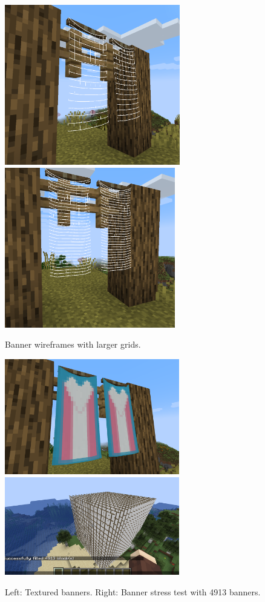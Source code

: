 \documentclass[12pt]{article}
\begin{document}
\begin{figure}[hp]
    \begin{center}
        \includegraphics[height=2.75in]{images/bannermidgridwf.png}
        \includegraphics[height=2.75in]{images/bannerlargegridwf.png}
    \end{center}
    \caption{Banner wireframes with larger grids.}
\end{figure}

\begin{figure}[hp]
    \begin{center}
        \includegraphics[width=3in]{images/transbanners.png}
        \includegraphics[width=3in]{images/4913stresstest.png}
    \end{center}
    \caption{Left: Textured banners. Right: Banner stress test with 4913 banners.}
\end{figure}
\end{document}

